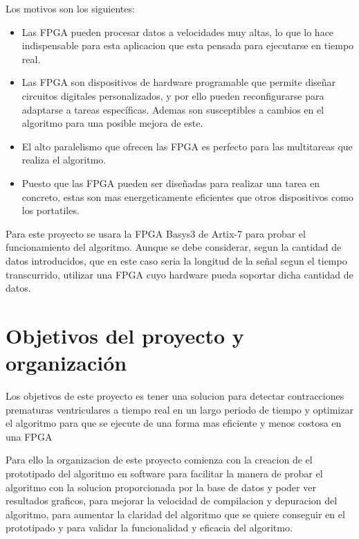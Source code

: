 Los motivos son los siguientes:

\begin{itemize}
	\item Las FPGA pueden procesar datos a velocidades muy altas, lo que lo hace indispensable para esta aplicacion
	 que esta pensada para ejecutarse en tiempo real.
	\item Las FPGA son dispositivos de hardware programable que permite diseñar circuitos digitales personalizados, 
	y por ello pueden reconfigurarse para adaptarse a tareas específicas. Ademas son susceptibles a cambios en el 
	algoritmo para una posible mejora de este.
	\item El alto paralelismo que ofrecen las FPGA es perfecto para las multitareas que realiza el algoritmo.
	\item Puesto que las FPGA pueden ser diseñadas para realizar una tarea en concreto, estas son mas energeticamente
	eficientes que otros dispositivos como los portatiles.
\end{itemize}

Para este proyecto se usara la FPGA Basys3 de Artix-7 para probar el funcionamiento del algoritmo. Aunque se debe considerar, segun
la cantidad de datos introducidos, que en este caso seria la longitud de la señal segun el tiempo transcurrido, utilizar
una FPGA cuyo hardware pueda soportar dicha cantidad de datos.


\section{Objetivos del proyecto y organización}
Los objetivos de este proyecto es tener una solucion para detectar contracciones prematuras ventriculares a tiempo real en
un largo periodo de tiempo y optimizar el algoritmo para que se ejecute de una forma mas eficiente y menos costosa en una FPGA

Para ello la organizacion de este proyecto comienza con la creacion de el prototipado del algoritmo en software para facilitar
la manera de probar el algoritmo con la solucion proporcionada por la base de datos y poder ver resultados graficos, para mejorar
la velocidad de compilacion y depuracion del algoritmo, para aumentar la claridad del algoritmo que se quiere conseguir en el
prototipado y para validar la funcionalidad y eficacia del algoritmo.
